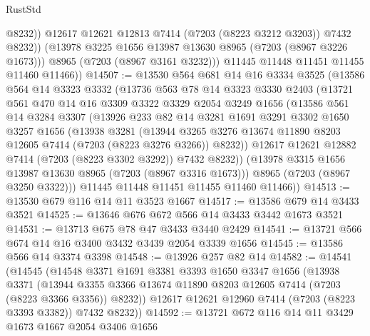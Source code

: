 \begin{lexlean}{RustStd}
\begin{coremodule}
                  @8232))
              @12617
              @12621
              @12813
              @7414
              (@7203 (@8223 @3212 @3203))
              @7432
              @8232))
          (@13978 @3225 @1656 @13987 @13630 @8965 (@7203 (@8967 @3226 @1673)))
          @8965
          (@7203 (@8967 @3161 @3232)))
        @11445
        @11448
        @11451
        @11455
        @11460
        @11466))
@14507 := @13530
    @564
    @681
    @14
    @16
    @3334
    @3525
    (@13586
      @564
      @14
      @3323
      @3332
      (@13736
        @563
        @78
        @14
        @3323
        @3330
        @2403
        (@13721
          @561
          @470
          @14
          @16
          @3309
          @3322
          @3329
          @2054
          @3249
          @1656
          (@13586
            @561
            @14
            @3284
            @3307
            (@13926
              @233
              @82
              @14
              @3281
              @1691
              @3291
              @3302
              @1650
              @3257
              @1656
              (@13938
                @3281
                (@13944
                  @3265
                  @3276
                  @13674
                  @11890
                  @8203
                  @12605
                  @7414
                  (@7203 (@8223 @3276 @3266))
                  @8232))
              @12617
              @12621
              @12882
              @7414
              (@7203 (@8223 @3302 @3292))
              @7432
              @8232))
          (@13978 @3315 @1656 @13987 @13630 @8965 (@7203 (@8967 @3316 @1673)))
          @8965
          (@7203 (@8967 @3250 @3322)))
        @11445
        @11448
        @11451
        @11455
        @11460
        @11466))
@14513 := @13530 @679 @116 @14 @11 @3523 @1667
@14517 := @13586 @679 @14 @3433 @3521
@14525 := @13646 @676 @672 @566 @14 @3433 @3442 @1673 @3521
@14531 := @13713 @675 @78 @47 @3433 @3440 @2429
@14541 := @13721 @566 @674 @14 @16 @3400 @3432 @3439 @2054 @3339 @1656
@14545 := @13586 @566 @14 @3374 @3398
@14548 := @13926 @257 @82 @14
@14582 := @14541
    (@14545
      (@14548
        @3371
        @1691
        @3381
        @3393
        @1650
        @3347
        @1656
        (@13938
          @3371
          (@13944 @3355 @3366 @13674 @11890 @8203 @12605 @7414 (@7203 (@8223 @3366 @3356)) @8232))
        @12617
        @12621
        @12960
        @7414
        (@7203 (@8223 @3393 @3382))
        @7432
        @8232))
@14592 := @13721 @672 @116 @14 @11 @3429 @1673 @1667 @2054 @3406 @1656

\end{coremodule}
\end{lexlean}

